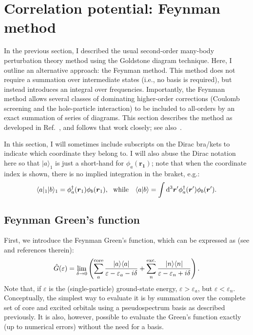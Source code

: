 \documentclass[10pt,twocolumn,a4paper]{article}%
\newcommand{\bra}[1]{\ensuremath{\langle #1|}}	%
\newcommand{\ket}[1]{\ensuremath{|#1\rangle}}	%
\newcommand{\braket}[1]{\ensuremath{\langle #1\rangle}}	%
\renewcommand{\v}[1]{\ensuremath{\boldsymbol{#1}}}		%
\newcommand{\be}{\begin{equation}}
\newcommand{\ee}{\end{equation}}
\def\d{\ensuremath{{\rm d}}}
\def\en{\ensuremath{\varepsilon}}
\begin{document}
\section{Correlation potential: Feynman method}


In the previous section, I described the usual second-order many-body perturbation theory method using the Goldstone diagram technique.
Here, I outline an alternative approach: the Feynman method.
This method does not require a summation over intermediate states (i.e., no basis is required), but instead introduces an integral over frequencies.
Importantly, the Feynman method allows several classes of dominating higher-order corrections (Coulomb screening and the hole-particle interaction) to be included to all-orders by an exact summation of series of diagrams.
This section describes the method as developed in Ref.~\cite{DzubaCPM1988pla}, and follows that work closely; see also~\cite{Abrikosov1965,DzubaCPM1989plaEn,GingesCs2002}.

In this section, I will sometimes include subscripts on the Dirac bra/kets to indicate which coordinate they belong to.
I will also abuse the Dirac notation here so that $\ket{a}_1$ is just a short-hand for $\phi_a(\v{r_1})$; note that when the coordinate index is shown, there is no implied integration in the braket, e.g.:
\[
\bra{a}_1\ket{b}_1 = \phi^\dag_a(\v{r}_1)\phi_b(\v{r}_1),
~~ \text{while}\quad
\braket{a|b} = \int\d^3\v{r}'\phi^\dag_a(\v{r}')\phi_b(\v{r}').
\]


\subsection{Feynman Green's function}

First, we introduce the Feynman Green's function, which can be expressed as (see \cite{DzubaCPM1988pla,Abrikosov1965} and references therein):
\be\label{eq:FeynmanGreen}
\hat G(\en) = \lim_{\delta\to0}\left(
\sum_a^{\rm core}\frac{\ket{a}\bra{a}}{\en-\en_a-i\delta} 
+ \sum_n^{\rm exc.}\frac{\ket{n}\bra{n}}{\en-\en_n+i\delta}\right).
\ee
Note that, if $\en$ is the (single-particle) ground-state energy, $\en>\en_a$, but $\en<\en_n$.
Conceptually, the simplest way to evaluate it is by summation over the complete set of core and excited orbitals using a pseudospectrum basis as described previously.
It is also, however, possible to evaluate the Green's function exactly (up to numerical errors) without the need for a basis.
\end{document}
